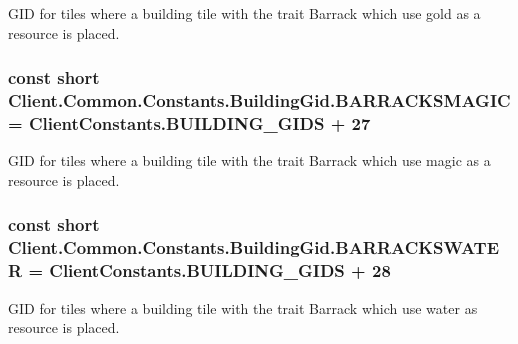 G\+I\+D for tiles where a building tile with the trait Barrack which use gold as a resource is placed. 

\hypertarget{classClient_1_1Common_1_1Constants_1_1BuildingGid_ac1ba3a14f7b780dd84ab94ad0db5252d}{}
\subsubsection[{B\+A\+R\+R\+A\+C\+K\+S\+M\+A\+G\+I\+C}]{\setlength{\rightskip}{0pt plus 5cm}const short Client.\+Common.\+Constants.\+Building\+Gid.\+B\+A\+R\+R\+A\+C\+K\+S\+M\+A\+G\+I\+C = {\bf Client\+Constants.\+B\+U\+I\+L\+D\+I\+N\+G\+\_\+\+G\+I\+D\+S} + 27}\label{classClient_1_1Common_1_1Constants_1_1BuildingGid_ac1ba3a14f7b780dd84ab94ad0db5252d}


G\+I\+D for tiles where a building tile with the trait Barrack which use magic as a resource is placed. 

\hypertarget{classClient_1_1Common_1_1Constants_1_1BuildingGid_a0b4b1c1a3ed14caad9a22c4f1950c8d5}{}
\subsubsection[{B\+A\+R\+R\+A\+C\+K\+S\+W\+A\+T\+E\+R}]{\setlength{\rightskip}{0pt plus 5cm}const short Client.\+Common.\+Constants.\+Building\+Gid.\+B\+A\+R\+R\+A\+C\+K\+S\+W\+A\+T\+E\+R = {\bf Client\+Constants.\+B\+U\+I\+L\+D\+I\+N\+G\+\_\+\+G\+I\+D\+S} + 28}\label{classClient_1_1Common_1_1Constants_1_1BuildingGid_a0b4b1c1a3ed14caad9a22c4f1950c8d5}


G\+I\+D for tiles where a building tile with the trait Barrack which use water as resource is placed. 

\hypertarget{classClient_1_1Common_1_1Constants_1_1BuildingGid_a89b0da51d43f94f88fdf5f11ea841910}{}
